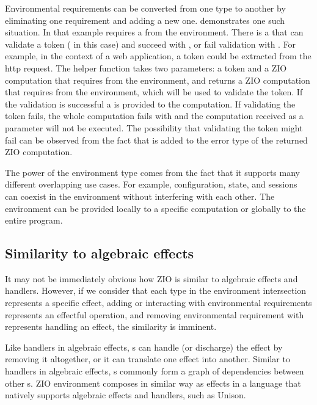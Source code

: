 Environmental requirements can be converted from one type to another by eliminating one requirement and adding a new one.  demonstrates one such situation. In that example  requires a  from the environment. There is a  that can validate a token ( in this case) and succeed with , or fail validation with . For example, in the context of a web application, a token could be extracted from the http request. The helper function  takes two parameters: a token and a ZIO computation that requires  from the environment, and returns a ZIO computation that requires  from the environment, which will be used to validate the token. If the validation is successful a  is provided to the computation. If validating the token fails, the whole computation fails with  and the computation received as a parameter will not be executed. The possibility that validating the token might fail can be observed from the fact that   is added to the error type of the returned ZIO computation.



The power of the environment type comes from the fact that it supports many different overlapping use cases. For example, configuration, state, and sessions can coexist in the environment without interfering with each other. The environment can be provided locally to a specific computation or globally to the entire program.


\subsection{Similarity to algebraic effects}
It may not be immediately obvious how ZIO is similar to algebraic effects and handlers.
However, if we consider that each type in the environment intersection represents a specific effect, adding or interacting with environmental requirements represents an effectful operation, and removing environmental requirement with  represents handling an effect, the similarity is imminent.

Like handlers in algebraic effects, s can handle (or discharge) the effect by removing it altogether, or it can translate one effect into another. Similar to handlers in algebraic effects, s commonly form a graph of dependencies between other s. ZIO environment composes in similar way as effects in a language that natively supports algebraic effects and handlers, such as Unison.

